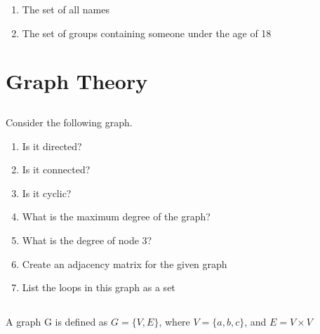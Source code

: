 \documentclass[twocolumn]{article}
\begin{document}
    \begin{enumerate}
        \item The set of all names
        \item The set of groups containing someone under the age of 18
    \end{enumerate}

\clearpage
\section{Graph Theory}

\subsection{}

    Consider the following graph.

    \begin{figure}[h!]
        \centering
    \end{figure}

    \begin{enumerate}
        \item Is it directed?
        \item Is it connected?
        \item Is it cyclic?
        \item What is the maximum degree of the graph?
        \item What is the degree of node 3?
        \item Create an adjacency matrix for the given graph
        \item List the loops in this graph as a set
    \end{enumerate}

\subsection{}

    A graph G is defined as $G = \{V, E\}$, where $V = \{ a, b, c \}$, and $E = V \times V$
\end{document}
